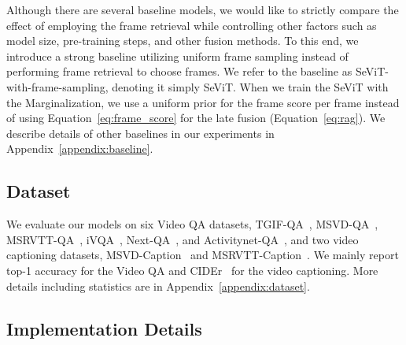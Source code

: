\documentclass{article}
\newcommand{\frameworkname}{SeViT}
\begin{document}
Although there are several baseline models, we would like to strictly compare the effect of employing the frame retrieval while controlling other factors such as model size, pre-training steps, and other fusion methods. To this end, we introduce a strong baseline utilizing uniform frame sampling instead of performing frame retrieval to choose  frames. We refer to the baseline as \frameworkname{}-with-frame-sampling, denoting it simply \frameworkname{}. When we train the \frameworkname{} with the Marginalization, we use a uniform prior  for the frame score per frame instead of using Equation~\ref{eq:frame_score} for the late fusion (Equation~\ref{eq:rag}). We describe details of other baselines in our experiments in Appendix~\ref{appendix:baseline}.

\subsection{Dataset}

We evaluate our models on six Video QA datasets, TGIF-QA~\cite{jang2017tgif}, MSVD-QA~\cite{xu2017video}, MSRVTT-QA~\cite{xu2017video}, iVQA~\cite{yang2021just}, Next-QA~\cite{xiao2021next}, and Activitynet-QA~\cite{yu2019activitynet}, and two video captioning datasets, MSVD-Caption~\cite{chen2011collecting} and MSRVTT-Caption~\cite{xu2016msr}. We mainly report top-1 accuracy for the Video QA and CIDEr~\cite{vedantam2015cider} for the video captioning. More details including statistics are in Appendix~\ref{appendix:dataset}.

\subsection{Implementation Details}
\end{document}
